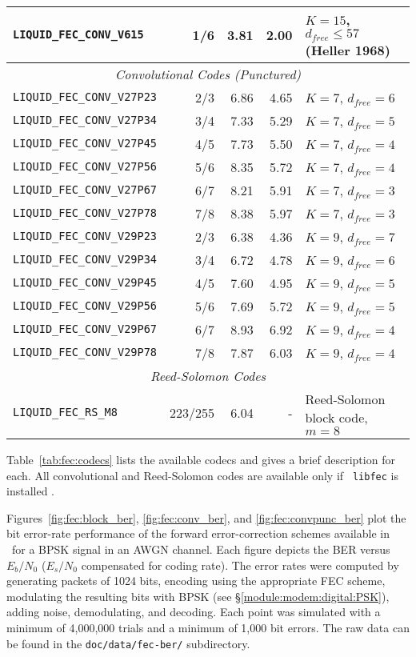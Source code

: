 \begin{table*}
{\begin{tabular*}{0.95\textwidth}{l@{\extracolsep{\fill}}rrrl}
{\tt LIQUID\_FEC\_CONV\_V615}   & 1/6     &  3.81 & 2.00 & $K=15$, $d_{free}\leq57$ (Heller 1968)\\\midrule
%
\multicolumn{5}{c}{{\em Convolutional Codes (Punctured)}}\\\midrule
{\tt LIQUID\_FEC\_CONV\_V27P23} & 2/3     &  6.86 & 4.65 & $K=7$, $d_{free}=6$\\
{\tt LIQUID\_FEC\_CONV\_V27P34} & 3/4     &  7.33 & 5.29 & $K=7$, $d_{free}=5$\\
{\tt LIQUID\_FEC\_CONV\_V27P45} & 4/5     &  7.73 & 5.50 & $K=7$, $d_{free}=4$\\
{\tt LIQUID\_FEC\_CONV\_V27P56} & 5/6     &  8.35 & 5.72 & $K=7$, $d_{free}=4$\\
{\tt LIQUID\_FEC\_CONV\_V27P67} & 6/7     &  8.21 & 5.91 & $K=7$, $d_{free}=3$\\
{\tt LIQUID\_FEC\_CONV\_V27P78} & 7/8     &  8.38 & 5.97 & $K=7$, $d_{free}=3$\\\midrule
%
{\tt LIQUID\_FEC\_CONV\_V29P23} & 2/3     &  6.38 & 4.36 & $K=9$, $d_{free}=7$\\
{\tt LIQUID\_FEC\_CONV\_V29P34} & 3/4     &  6.72 & 4.78 & $K=9$, $d_{free}=6$\\
{\tt LIQUID\_FEC\_CONV\_V29P45} & 4/5     &  7.60 & 4.95 & $K=9$, $d_{free}=5$\\
{\tt LIQUID\_FEC\_CONV\_V29P56} & 5/6     &  7.69 & 5.72 & $K=9$, $d_{free}=5$\\
{\tt LIQUID\_FEC\_CONV\_V29P67} & 6/7     &  8.93 & 6.92 & $K=9$, $d_{free}=4$\\
{\tt LIQUID\_FEC\_CONV\_V29P78} & 7/8     &  7.87 & 6.03 & $K=9$, $d_{free}=4$\\\midrule
% 
\multicolumn{5}{c}{{\em Reed-Solomon Codes}}\\\midrule
{\tt LIQUID\_FEC\_RS\_M8}       & 223/255 &  6.04 &    - & Reed-Solomon block code, $m=8$\\\bottomrule
\end{tabular*}
}
\end{table*}%
%
Table~\ref{tab:fec:codecs} lists the available codecs and gives a brief
description for each.
All convolutional and Reed-Solomon codes are available only if {\tt
libfec} is installed \cite{libfec:web}.

Figures~\ref{fig:fec:block_ber}, \ref{fig:fec:conv_ber}, and
\ref{fig:fec:convpunc_ber}
plot the bit error-rate performance of the forward
error-correction schemes available in \liquid\ for a BPSK signal
in an AWGN channel.
%
Each figure depicts the BER versus $E_b/N_0$
($E_s/N_0$ compensated for coding rate).
The error rates were computed by generating packets of 1024 bits,
encoding using the appropriate FEC scheme,
modulating the resulting bits with BPSK
(see \S\ref{module:modem:digital:PSK}),
adding noise, demodulating, and decoding.
Each point was simulated with a minimum of 4,000,000 trials
and a minimum of 1,000 bit errors.
The raw data can be found in the {\tt doc/data/fec-ber/}
subdirectory.

